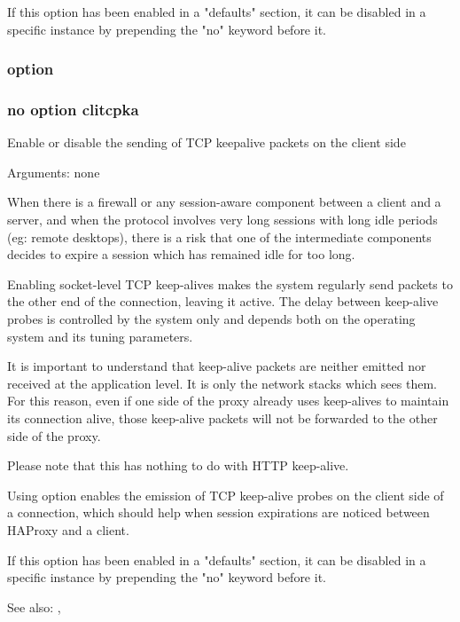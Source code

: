   If this option has been enabled in a "defaults" section, it can be disabled
  in a specific instance by prepending the "no" keyword before it.

\subsubsection[clitcpka]{option }
\subsubsection*{no option clitcpka}


  Enable or disable the sending of TCP keepalive packets on the client side

                                 
  Arguments: none

  When there is a firewall or any session-aware component between a client and
  a server, and when the protocol involves very long sessions with long idle
  periods (eg: remote desktops), there is a risk that one of the intermediate
  components decides to expire a session which has remained idle for too long.

  Enabling socket-level TCP keep-alives makes the system regularly send packets
  to the other end of the connection, leaving it active. The delay between
  keep-alive probes is controlled by the system only and depends both on the
  operating system and its tuning parameters.

  It is important to understand that keep-alive packets are neither emitted nor
  received at the application level. It is only the network stacks which sees
  them. For this reason, even if one side of the proxy already uses keep-alives
  to maintain its connection alive, those keep-alive packets will not be
  forwarded to the other side of the proxy.

  Please note that this has nothing to do with HTTP keep-alive.

  Using option  enables the emission of TCP keep-alive probes on the
  client side of a connection, which should help when session expirations are
  noticed between HAProxy and a client.

  If this option has been enabled in a "defaults" section, it can be disabled
  in a specific instance by prepending the "no" keyword before it.

  See also: , 

